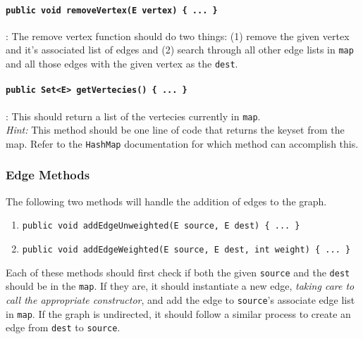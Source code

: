 \paragraph{\lstinline|public void removeVertex(E vertex) { ... }|}: The 
remove vertex function should do two things: (1) remove the given vertex
and it's associated list of edges and (2) search through all other 
edge lists in \lstinline|map| and all those edges with the given 
vertex as the \lstinline|dest|.


\paragraph{\lstinline|public Set<E> getVertecies() { ... }|}: This 
should return a list of the vertecies currently in \lstinline|map|. \\

\noindent\textit{Hint:} This method should be one line of code that returns
the keyset from the map. Refer to the \lstinline|HashMap| documentation for
which method can accomplish this.

\subsubsection{Edge Methods}

The following two methods will handle the addition of edges to the graph. 
\begin{enumerate}
    \item \lstinline|public void addEdgeUnweighted(E source, E dest) { ... }|
    \item \lstinline|public void addEdgeWeighted(E source, E dest, int weight) { ... }|
\end{enumerate}
Each of these methods should first check if both the given \lstinline|source|
and the \lstinline|dest| should be in the \lstinline|map|. If they are, it
should instantiate a new edge, \textit{taking care to call the appropriate
constructor}, and add the edge to \lstinline|source|'s associate edge list in
\lstinline|map|. If the graph is undirected, it should follow a similar process
to create an edge from \lstinline|dest| to \lstinline|source|.


